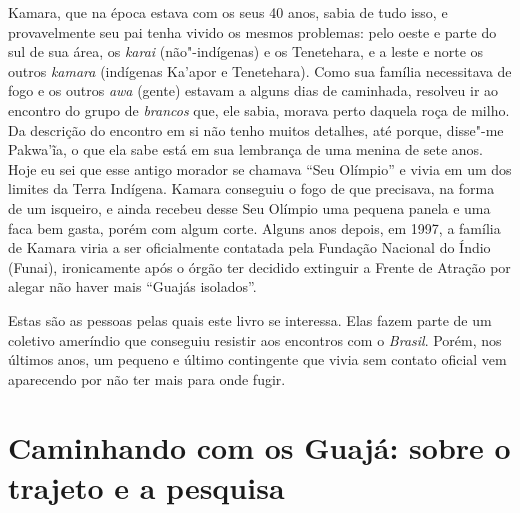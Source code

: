 Kamara, que na época estava com os seus 40 anos, sabia de tudo isso, e
provavelmente seu pai tenha vivido os mesmos problemas: pelo oeste e
parte do sul de sua área, os \emph{karai} (não"-indígenas) e os Tenetehara, e a leste e norte os outros \emph{kamara} (indígenas
Ka'apor e Tenetehara). Como sua família necessitava de fogo e os outros
\emph{awa} (gente) estavam a alguns dias de caminhada, resolveu ir ao
encontro do grupo de \emph{brancos} que, ele sabia, morava perto daquela
roça de milho. Da descrição do encontro em si não tenho muitos detalhes,
até porque, disse"-me Pakwa'ĩa, o que ela sabe está em sua lembrança de
uma menina de sete anos. Hoje eu sei que esse antigo morador se chamava
``Seu Olímpio'' e vivia em um dos limites da Terra Indígena. Kamara
conseguiu o fogo de que precisava, na forma de um isqueiro, e ainda
recebeu desse Seu Olímpio uma pequena panela e uma faca bem gasta, porém
com algum corte. Alguns anos depois, em 1997, a família de Kamara viria
a ser oficialmente contatada pela Fundação Nacional do Índio (Funai),
ironicamente após o órgão ter decidido extinguir a Frente de Atração por
alegar não haver mais ``Guajás isolados''.

Estas são as pessoas pelas quais este livro se interessa. Elas fazem
parte de um coletivo ameríndio que conseguiu resistir aos encontros com
o \emph{Brasil}. Porém, nos últimos anos, um pequeno e último
contingente que vivia sem contato oficial vem aparecendo por não ter
mais para onde fugir.

\section{Caminhando com os Guajá: sobre o trajeto e a pesquisa}

